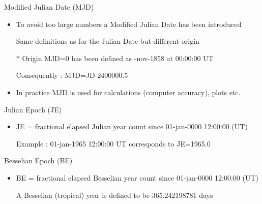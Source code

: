 \Tr
\begin{center}
{\red Modified Julian Date (MJD)}
\end{center}
%
\begin{itemize}
\item To avoid too large numbers a {\blue Modified Julian Date} has been introduced 
\item[] Same definitions as for the Julian Date but different origin
\item[$\ast$] {\blue Origin MJD=0} has been defined as {-nov-1858 at 00:00:00 UT}
\item[] Consequently : {\blue MJD=JD-2400000.5}
\item In practice MJD is used for calculations (computer accuracy), plots etc.
\end{itemize}
%
\begin{center}
{\red Julian Epoch (JE)}
\end{center}
%
\begin{itemize}
\item JE = fractional elapsed Julian year count since 01-jan-0000 12:00:00 (UT)
\item[] Example : 01-jan-1965 12:00:00 UT corresponds to JE=1965.0
\end{itemize}
%
\begin{center}
{\red Besselian Epoch (BE)}
\end{center}
%
\begin{itemize}
\item BE = fractional elapsed Besselian year count since 01-jan-0000 12:00:00 (UT)
\item[] A Besselian (tropical) year is defined to be 365.242198781 days
\end{itemize}
